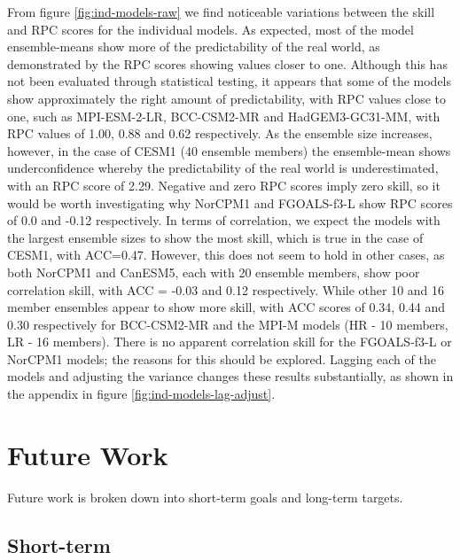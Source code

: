 \documentclass{article}
\begin{document}
From figure \ref*{fig:ind-models-raw} we find noticeable variations between the skill and RPC scores for the individual models. As expected, most of the model ensemble-means show more of the predictability of the real world, as demonstrated by the RPC scores showing values closer to one. Although this has not been evaluated through statistical testing, it appears that some of the models show approximately the right amount of predictability, with RPC values close to one, such as MPI-ESM-2-LR, BCC-CSM2-MR and HadGEM3-GC31-MM, with RPC values of 1.00, 0.88 and 0.62 respectively. As the ensemble size increases, however, in the case of CESM1 (40 ensemble members) the ensemble-mean shows underconfidence whereby the predictability of the real world is underestimated, with an RPC score of 2.29. Negative and zero RPC scores imply zero skill, so it would be worth investigating why NorCPM1 and FGOALS-f3-L show RPC scores of 0.0 and -0.12 respectively. In terms of correlation, we expect the models with the largest ensemble sizes to show the most skill, which is true in the case of CESM1, with ACC=0.47. However, this does not seem to hold in other cases, as both NorCPM1 and CanESM5, each with 20 ensemble members, show poor correlation skill, with ACC = -0.03 and 0.12 respectively. While other 10 and 16 member ensembles appear to show more skill, with ACC scores of 0.34, 0.44 and 0.30 respectively for BCC-CSM2-MR and the MPI-M models (HR - 10 members, LR - 16 members). There is no apparent correlation skill for the FGOALS-f3-L or NorCPM1 models; the reasons for this should be explored. Lagging each of the models and adjusting the variance changes these results substantially, as shown in the appendix in figure \ref{fig:ind-models-lag-adjust}.  

\section*{Future Work}

Future work is broken down into short-term goals and long-term targets. 

\subsection{Short-term}
\end{document}
